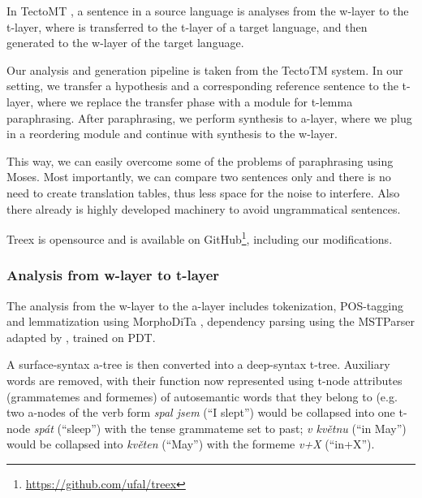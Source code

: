 \documentclass[11pt]{article}
\def\footurl#1{\footnote{\url{#1}}}
\begin{document}
In TectoMT \cite{tectomt}, a sentence in a source language is analyses from 
the w-layer to the t-layer, where is transferred to the t-layer of a target 
language, and then generated to the w-layer of the target language. 

Our analysis and generation pipeline is taken from the TectoTM system. In our 
setting, we transfer a hypothesis and a corresponding reference sentence to 
the t-layer, where we replace the transfer phase with a module for t-lemma 
paraphrasing. After paraphrasing, we perform synthesis to a-layer, where we 
plug in a reordering module and continue with synthesis to the w-layer. 

This way, we can easily overcome some of the problems of paraphrasing using 
Moses. Most importantly, we can compare two sentences only and there is no need 
to create translation tables, thus less space for the noise to interfere. Also 
there already is highly developed machinery to avoid ungrammatical sentences. 

Treex is opensource and is available on GitHub\footurl{https://github.com/ufal/treex}, 
including our modifications.

\subsubsection{Analysis from w-layer to t-layer}
The analysis from the w-layer to the a-layer includes tokenization, POS-tagging
and lemmatization using MorphoDiTa \cite{morphodita}, dependency parsing using
the MSTParser \cite{McDonald:2005} adapted by , trained on
PDT.

A surface-syntax a-tree is then converted into a deep-syntax t-tree. Auxiliary 
words are removed, with their function now represented using t-node attributes 
(grammatemes and formemes) of autosemantic words that they belong to (e.g. two
a-nodes of the verb form \textit{spal jsem} (``I slept'') would be collapsed 
into one t-node \textit{spát} (``sleep'') with the tense grammateme set to 
past; \textit{v květnu} (``in May'') would be collapsed into \textit{květen} 
(``May'') with the formeme \textit{v+X} (``in+X'').
\end{document}
